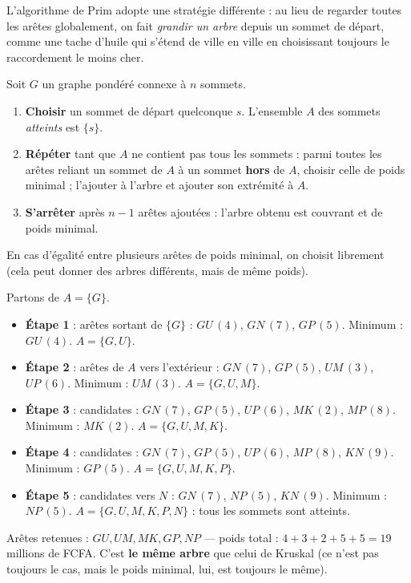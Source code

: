 \documentclass[11pt]{article}
\newcommand{\cle}[1]{{\popxbold\color{popdark}#1}}
\newcounter{popsec}
\newcounter{popsub}
\newcommand{\courssub}[1]{%
  \stepcounter{popsub}%
  \par\vspace{9pt}\noindent{\popxbold\fontsize{11.5}{13}\selectfont\color{popink}{\color{poporange}\thepopsec.\thepopsub}\hspace{6pt}#1}\par\nopagebreak\vspace{4pt}
}
\begin{document}
\courssub{L'algorithme de Prim}

L'algorithme de Prim adopte une stratégie différente : au lieu de regarder toutes les arêtes globalement, on fait \emph{grandir un arbre} depuis un sommet de départ, comme une tache d'huile qui s'étend de ville en ville en choisissant toujours le raccordement le moins cher.

\begin{methode}
Soit $G$ un graphe pondéré connexe à $n$ sommets.
\begin{enumerate}
\item \textbf{Choisir} un sommet de départ quelconque $s$. L'ensemble $A$ des sommets \emph{atteints} est $\{s\}$.
\item \textbf{Répéter} tant que $A$ ne contient pas tous les sommets : parmi toutes les arêtes reliant un sommet de $A$ à un sommet \textbf{hors} de $A$, choisir celle de \cle{poids minimal} ; l'ajouter à l'arbre et ajouter son extrémité à $A$.
\item \textbf{S'arrêter} après $n-1$ arêtes ajoutées : l'arbre obtenu est couvrant et de poids minimal.
\end{enumerate}
En cas d'égalité entre plusieurs arêtes de poids minimal, on choisit librement (cela peut donner des arbres différents, mais de même poids).
\end{methode}

\begin{exemplebox}
Partons de $A = \{G\}$.
\begin{itemize}
\item \textbf{Étape 1} : arêtes sortant de $\{G\}$ : $GU\,(4)$, $GN\,(7)$, $GP\,(5)$. Minimum : $GU\,(4)$. $A = \{G, U\}$.
\item \textbf{Étape 2} : arêtes de $A$ vers l'extérieur : $GN\,(7)$, $GP\,(5)$, $UM\,(3)$, $UP\,(6)$. Minimum : $UM\,(3)$. $A = \{G, U, M\}$.
\item \textbf{Étape 3} : candidates : $GN\,(7)$, $GP\,(5)$, $UP\,(6)$, $MK\,(2)$, $MP\,(8)$. Minimum : $MK\,(2)$. $A = \{G, U, M, K\}$.
\item \textbf{Étape 4} : candidates : $GN\,(7)$, $GP\,(5)$, $UP\,(6)$, $MP\,(8)$, $KN\,(9)$. Minimum : $GP\,(5)$. $A = \{G, U, M, K, P\}$.
\item \textbf{Étape 5} : candidates vers $N$ : $GN\,(7)$, $NP\,(5)$, $KN\,(9)$. Minimum : $NP\,(5)$. $A = \{G, U, M, K, P, N\}$ : tous les sommets sont atteints.
\end{itemize}
Arêtes retenues : $GU, UM, MK, GP, NP$ — poids total : $4+3+2+5+5 = 19$ millions de FCFA. C'est \textbf{le même arbre} que celui de Kruskal (ce n'est pas toujours le cas, mais le poids minimal, lui, est toujours le même).
\end{exemplebox}
\end{document}
